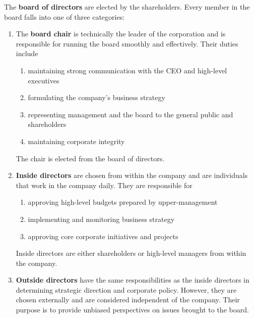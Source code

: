 \documentclass{article}
\begin{document}
    \begin{definition}
      The \textbf{board of directors} are elected by the shareholders. Every member in the board falls into one of three categories: 
      \begin{enumerate}
          \item The \textbf{board chair} is technically the leader of the corporation and is responsible for running the board smoothly and effectively. Their duties include
          \begin{enumerate}
              \item maintaining strong communication with the CEO and high-level executives
              \item formulating the company's business strategy
              \item representing management and the board to the general public and shareholders
              \item maintaining corporate integrity
          \end{enumerate}
          The chair is elected from the board of directors. 
          \item \textbf{Inside directors} are chosen from within the company and are individuals that work in the company daily. They are responsible for
          \begin{enumerate}
              \item approving high-level budgets prepared by upper-management
              \item implementing and monitoring business strategy
              \item approving core corporate initiatives and projects
          \end{enumerate}
          Inside directors are either shareholders or high-level managers from within the company. 
          \item \textbf{Outside directors} have the same responsibilities as the inside directors in determining strategic direction and corporate policy. However, they are chosen externally and are considered independent of the company. Their purpose is to provide unbiased perspectives on issues brought to the board. 
      \end{enumerate}
    \end{definition}
\end{document}
